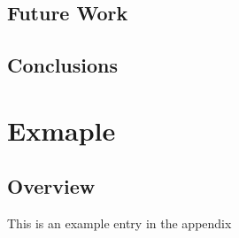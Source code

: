 \documentclass[a4paper,twoside,phd]{BYUPhys}
\begin{document}
\section{Future Work}
\label{FutureWork}

\section{Conclusions}
\label{sec:ConclusionsConclusions}



\clearemptydoublepage


\appendix
\chapter{Exmaple}
\section{Overview}
This is an example entry in the appendix



%

%

%
\end{document}
